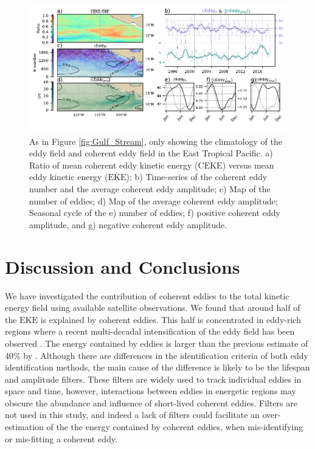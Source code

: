 \documentclass[draft,linenumbers]{agujournal2019}
\newcommand{\MEKE}{\overline{\textrm{EKE}}}
\newcommand{\EKE}{\textrm{EKE}}
\newcommand{\MCEKE}{\overline{\textrm{CEKE}}}
\begin{document}
	\begin{figure}
	    \centering
	    \includegraphics[width=1\textwidth]{./figures/regional_ratios_and_stats_V3_3.pdf}
	    \caption{As in Figure \ref{fig:Gulf_Stream}, only showing the  climatology of the eddy field and coherent eddy field in the East Tropical Pacific. a) Ratio of mean coherent eddy kinetic energy ($\MCEKE$) versus mean eddy kinetic energy ($\MEKE$); b) Time-series of the coherent eddy number and the average coherent eddy amplitude; c) Map of the number of eddies; d) Map of the average coherent eddy amplitude; Seasonal cycle of the e) number of eddies; f) positive coherent eddy amplitude, and g) negative coherent eddy amplitude.}
	    \label{fig:tehuantepec}
	\end{figure}	


	\section{Discussion and Conclusions}	
	\label{sec:Conclusions}

	We have investigated the contribution of coherent eddies to the total kinetic energy field using available satellite observations. 
	We found that around half of the $\EKE$ is explained by coherent eddies. 
	This half is concentrated in eddy-rich regions where a recent multi-decadal intensification of the eddy field has been observed \citep{Martinez_Kinetic_2021}. The energy contained by eddies is larger than the previous estimate of 40\% by \citet{Chelton_The_2011}.
	Although there are differences in the identification criteria of both eddy identification methods, the main cause of the difference is likely to be the lifespan and amplitude filters. 
	These filters are widely used to track individual eddies in space and time, however, interactions between eddies in energetic regions may obscure the abundance and influence of short-lived coherent eddies. 
	Filters are not used in this study, and indeed a lack of filters could facilitate an over-estimation of the the energy contained by coherent eddies, when mis-identifying or mis-fitting a coherent eddy. 
\end{document}
